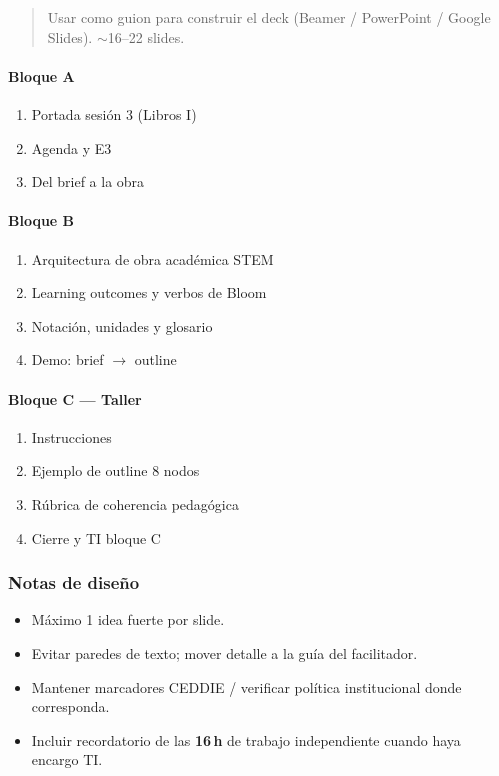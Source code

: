 \begin{quote}
Usar como guion para construir el deck (Beamer / PowerPoint / Google Slides). $\sim$16--22 slides.
\end{quote}

\paragraph{Bloque A}\begin{enumerate}
\item Portada sesión 3 (Libros I)
\item Agenda y E3
\item Del brief a la obra
\end{enumerate}
\paragraph{Bloque B}\begin{enumerate}
\item Arquitectura de obra académica STEM
\item Learning outcomes y verbos de Bloom
\item Notación, unidades y glosario
\item Demo: brief $\rightarrow$ outline
\end{enumerate}
\paragraph{Bloque C --- Taller}\begin{enumerate}
\item Instrucciones
\item Ejemplo de outline 8 nodos
\item Rúbrica de coherencia pedagógica
\item Cierre y TI bloque C
\end{enumerate}

\subsubsection*{Notas de diseño}
\begin{itemize}
\item Máximo 1 idea fuerte por slide.
\item Evitar paredes de texto; mover detalle a la guía del facilitador.
\item Mantener marcadores CEDDIE / verificar política institucional donde corresponda.
\item Incluir recordatorio de las \textbf{16\,h} de trabajo independiente cuando haya encargo TI.
\end{itemize}
